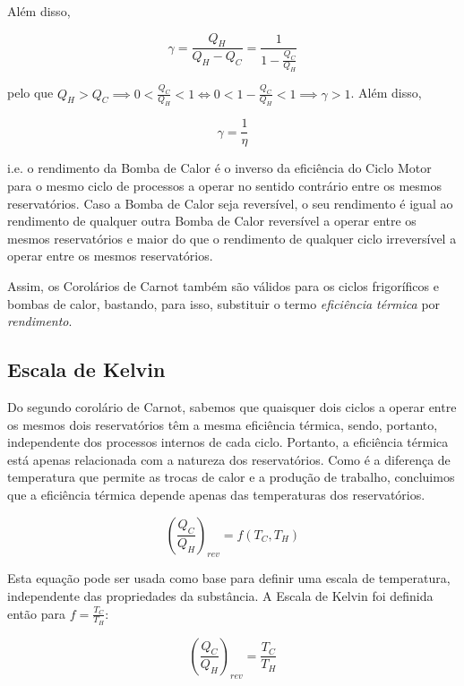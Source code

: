 Além disso, 

\begin{equation*}
    \gamma = \frac{Q_H}{Q_H - Q_C} = \frac{1}{1 - \frac{Q_C}{Q_H}}
\end{equation*}

pelo que $Q_H > Q_C \implies 0 < \frac{Q_C}{Q_H} < 1 \Longleftrightarrow 0 < 1 - \frac{Q_C}{Q_H} < 1 \implies \gamma > 1$.
Além disso, 

\begin{equation}
    \gamma = \frac{1}{\eta}
\end{equation}

i.e. o rendimento da Bomba de Calor é o inverso da eficiência do Ciclo Motor para o mesmo ciclo de processos a operar no sentido contrário entre os mesmos reservatórios. Caso a Bomba de Calor seja reversível, o seu rendimento é igual ao rendimento de qualquer outra Bomba de Calor reversível a operar entre os mesmos reservatórios e maior do que o rendimento de qualquer ciclo irreversível a operar entre os mesmos reservatórios.

Assim, os Corolários de Carnot também são válidos para os ciclos frigoríficos e bombas de calor, bastando, para isso, substituir o termo \textit{eficiência térmica} por \textit{rendimento}.


\subsection{Escala de Kelvin}

Do segundo corolário de Carnot, sabemos que quaisquer dois ciclos a operar entre os mesmos dois reservatórios têm a mesma eficiência térmica, sendo, portanto, independente dos processos internos de cada ciclo. Portanto, a eficiência térmica está apenas relacionada com a natureza dos reservatórios. Como é a diferença de temperatura que permite as trocas de calor e a produção de trabalho, concluimos que a eficiência térmica depende apenas das temperaturas dos reservatórios.

\begin{equation}
    \left( \frac{Q_C}{Q_H} \right)_{rev} = f(T_C, T_H)
\end{equation}

Esta equação pode ser usada como base para definir uma escala de temperatura, independente das propriedades da substância. A Escala de Kelvin foi definida então para $f = \frac{T_C}{T_H}$: 

\begin{equation}
    \left( \frac{Q_C}{Q_H} \right)_{rev} = \frac{T_C}{T_H}
\end{equation}

